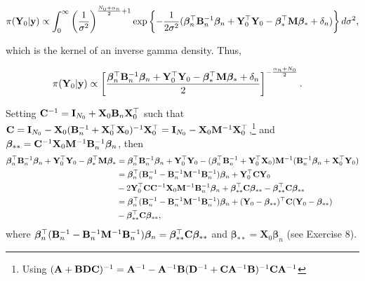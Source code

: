 \begin{align*}
	\pi({\bf{Y}}_0|{\bf{y}})&\propto\int_{0}^{\infty}\left(\frac{1}{\sigma^2}\right)^{\frac{N_0+\alpha_n}{2}+1}\exp\left\{-\frac{1}{2\sigma^2}(\bm{\beta}_n^{\top}{\bf{B}}_n^{-1}\bm{\beta}_n+{\bf{Y}}_0^{\top}{\bf{Y}}_0-\bm{\beta}_*^{\top}{\bf{M}}\bm{\beta}_*+\delta_n)\right\}d\sigma^2,\\
\end{align*}

which is the kernel of an inverse gamma density. Thus,

\begin{align*}
	\pi({\bf{Y}}_0|{\bf{y}})&\propto \left[\frac{\bm{\beta}_n^{\top}{\bf{B}}_n^{-1}\bm{\beta}_n+{\bf{Y}}_0^{\top}{\bf{Y}}_0-\bm{\beta}_*^{\top}{\bf{M}}\bm{\beta}_*+\delta_n}{2}\right]^{-\frac{\alpha_n+N_0}{2}}.
\end{align*}

Setting ${\bf{C}}^{-1}={\bf{I}}_{N_0}+{\bf{X}}_0{\bf{B}}_n{\bf{X}}_0^{\top}$ such that ${\bf{C}}={\bf{I}}_{N_0}-{\bf{X}}_0({\bf{B}}_n^{-1}+{\bf{X}}_0^{\top}{\bf{X}}_0)^{-1}{\bf{X}}_0^{\top}={\bf{I}}_{N_0}-{\bf{X}}_0{\bf{M}}^{-1}{\bf{X}}_0^{\top}$,\footnote{Using $({\bf{A}}+{\bf{B}}{\bf{D}}{\bf{C}})^{-1}={\bf{A}}^{-1}-{\bf{A}}^{-1}{\bf{B}}({\bf{D}}^{-1}+{\bf{C}}{\bf{A}}^{-1}{\bf{B}})^{-1}{\bf{C}}{\bf{A}}^{-1}$} and ${\bf{\bm{\beta}}}_{**}={\bf{C}}^{-1}{\bf{X}}_0{\bf{M}}^{-1}{\bf{B}}_n^{-1}\bm{\beta}_n$, then 
{\footnotesize{
\begin{align*}
	\bm{\beta}_n^{\top}{\bf{B}}_n^{-1}\bm{\beta}_n+{\bf{Y}}_0^{\top}{\bf{Y}}_0-\bm{\beta}_*^{\top}{\bf{M}}\bm{\beta}_*&=
	\bm{\beta}_n^{\top}{\bf{B}}_n^{-1}\bm{\beta}_n+{\bf{Y}}_0^{\top}{\bf{Y}}_0-(\bm{\beta}_n^{\top}{\bf{B}}_n^{-1}+{\bf{Y}}_0^{\top}{\bf{X}}_0){\bf{M}}^{-1}({\bf{B}}_n^{-1}\bm{\beta}_n+{\bf{X}}_0^{\top}{\bf{Y}}_0)\\
	&=\bm{\beta}_n^{\top}({\bf{B}}_n^{-1}-{\bf{B}}_n^{-1}{\bf{M}}^{-1}{\bf{B}}_n^{-1})\bm{\beta}_n+{\bf{Y}}_0^{\top}{\bf{C}}{\bf{Y}}_0\\
	&-2{\bf{Y}}_0^{\top}{\bf{C}}{\bf{C}}^{-1}{\bf{X}}_0{\bf{M}}^{-1}{\bf{B}}_n^{-1}\bm{\beta}_n+{\bf{\bm{\beta}}}_{**}^{\top}{\bf{C}}{\bf{\bm{\beta}}}_{**}-{\bf{\bm{\beta}}}_{**}^{\top}{\bf{C}}{\bf{\bm{\beta}}}_{**}\\
	&=\bm{\beta}_n^{\top}({\bf{B}}_n^{-1}-{\bf{B}}_n^{-1}{\bf{M}}^{-1}{\bf{B}}_n^{-1})\bm{\beta}_n+({\bf{Y}}_0-{\bf{\bm{\beta}}}_{**})^{\top}{\bf{C}}({\bf{Y}}_0-{\bf{\bm{\beta}}}_{**})\\
	&-{\bf{\bm{\beta}}}_{**}^{\top}{\bf{C}}{\bf{\bm{\beta}}}_{**},
\end{align*}
}}
where $\bm{\beta}_n^{\top}({\bf{B}}_n^{-1}-{\bf{B}}_n^{-1}{\bf{M}}^{-1}{\bf{B}}_n^{-1})\bm{\beta}_n={\bf{\bm{\beta}}}_{**}^{\top}{\bf{C}}{\bf{\bm{\beta}}}_{**}$ and $\bm{\beta}_{**}={\mathbf{X}}_0\bm{\beta}_n$ (see Exercise 8).

